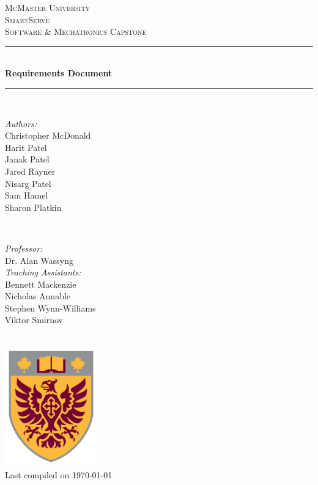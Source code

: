 \documentclass[11pt]{article}
\begin{document}
\begin{titlepage}
	\newcommand{\HRule}{\rule{\linewidth}{0.2mm}}
	\begin{center}
	\textsc{\LARGE McMaster University}\\[1.5cm]
	
	\textsc{\Large SmartServe}\\[0.5cm]
	\textsc{\large Software \& Mechatronics Capstone}\\[0.5cm] 

	\HRule\\[0.4cm]
		{\huge\bfseries Requirements Document}\\[0.4cm]
	\HRule\\[0.4cm]
	
	\begin{minipage}[t][][t]{0.5\textwidth}
		\begin{flushleft} \large
			\emph{Authors:}\\
			Christopher McDonald\\
			Harit Patel \\
			Janak Patel \\
			Jared Rayner  \\
			Nisarg Patel  \\
			Sam Hamel \\
			Sharon Platkin \\
		\end{flushleft}
	\end{minipage}
	~
	\begin{minipage}[t][][t]{0.4\textwidth}
		\begin{flushright} \large
			\emph{Professor:} \\
			Dr. Alan Wassyng \\[0.4cm]
			\emph{Teaching Assistants:} \\
			Bennett Mackenzie \\ 
			Nicholas Annable \\ 
			Stephen Wynn-Williams \\ 
			Viktor Smirnov
		\end{flushright}
	\end{minipage}\\[2cm]
	
	\includegraphics[width=0.3\textwidth]{logo.png} \\
	{\large Last compiled on \today}
	\end{center}

\end{titlepage}
\end{document}
